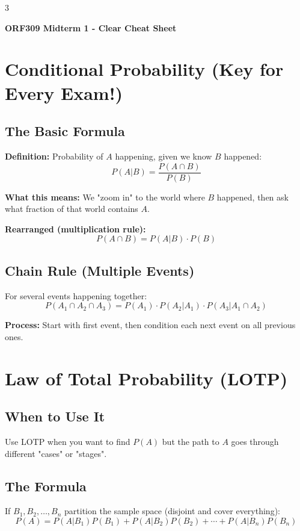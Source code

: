 \documentclass[10pt,landscape]{article}
\begin{document}
\begin{multicols}{3}
\small

\begin{center}
\textbf{\large ORF309 Midterm 1 - Clear Cheat Sheet}
\end{center}

\section{Conditional Probability (Key for Every Exam!)}

\subsection{The Basic Formula}
\textbf{Definition:} Probability of $A$ happening, given we know $B$ happened:
$$P(A|B) = \frac{P(A \cap B)}{P(B)}$$

\textbf{What this means:} We "zoom in" to the world where $B$ happened, then ask what fraction of that world contains $A$.

\textbf{Rearranged (multiplication rule):}
$$P(A \cap B) = P(A|B) \cdot P(B)$$

\subsection{Chain Rule (Multiple Events)}
For several events happening together:
$$P(A_1 \cap A_2 \cap A_3) = P(A_1) \cdot P(A_2|A_1) \cdot P(A_3|A_1 \cap A_2)$$

\textbf{Process:} Start with first event, then condition each next event on all previous ones.

\section{Law of Total Probability (LOTP)}

\subsection{When to Use It}
Use LOTP when you want to find $P(A)$ but the path to $A$ goes through different "cases" or "stages".

\subsection{The Formula}
If $B_1, B_2, \ldots, B_n$ partition the sample space (disjoint and cover everything):
$$P(A) = P(A|B_1)P(B_1) + P(A|B_2)P(B_2) + \cdots + P(A|B_n)P(B_n)$$


\end{multicols}
\end{document}
